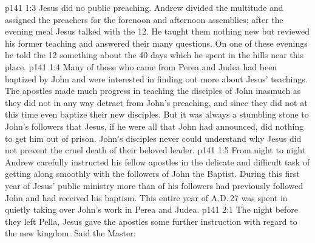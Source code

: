 \vs p141 1:3 Jesus did no public preaching. Andrew divided the multitude and assigned the preachers for the forenoon and afternoon assemblies; after the evening meal Jesus talked with the 12. He taught them nothing new but reviewed his former teaching and answered their many questions. On one of these evenings he told the 12 something about the 40 days which he spent in the hills near this place.
\vs p141 1:4 Many of those who came from Perea and Judea had been baptized by John and were interested in finding out more about Jesus’ teachings. The apostles made much progress in teaching the disciples of John inasmuch as they did not in any way detract from John’s preaching, and since they did not at this time even baptize their new disciples. But it was always a stumbling stone to John’s followers that Jesus, if he were all that John had announced, did nothing to get him out of prison. John’s disciples never could understand why Jesus did not prevent the cruel death of their beloved leader.
\vs p141 1:5 From night to night Andrew carefully instructed his fellow apostles in the delicate and difficult task of getting along smoothly with the followers of John the Baptist. During this first year of Jesus’ public ministry more than  of his followers had previously followed John and had received his baptism. This entire year of A.D.\,27 was spent in quietly taking over John’s work in Perea and Judea.
\vs p141 2:1 The night before they left Pella, Jesus gave the apostles some further instruction with regard to the new kingdom. Said the Master: 
